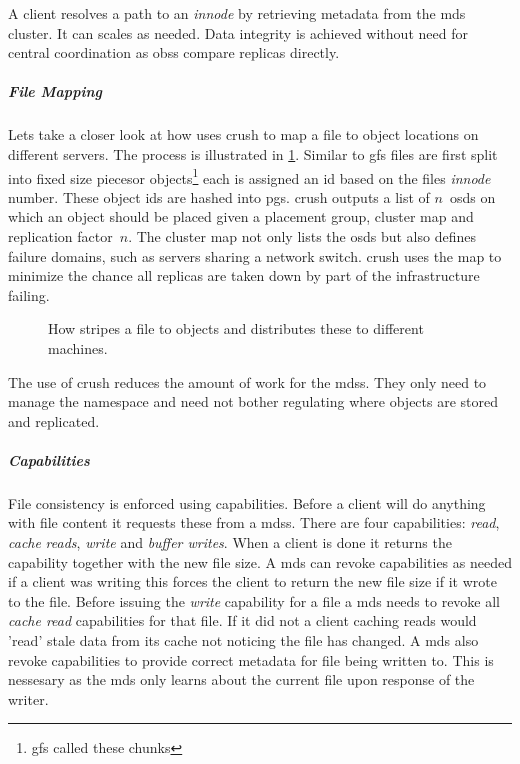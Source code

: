 A client resolves a path to an \textit{innode} by retrieving metadata from the \ac{mds} cluster. It can scales as needed. Data integrity is achieved without need for central coordination as \acp{obs} compare replicas directly. 

\subparagraph{File Mapping}
Lets take a closer look at how \ceph{} uses \ac{crush} to map a file to object locations on different servers. The process is illustrated in \cref{fig:ceph_crush}. Similar to \ac{gfs} files are first split into fixed size piecesor objects\footnote{\ac{gfs} called these chunks} each is assigned an id based on the files \textit{innode} number. These object ids are hashed into \acp{pg}. \ac{crush} outputs a list of $n$~\acp{osd} on which an object should be placed given a placement group, cluster map and replication factor~$n$. The cluster map not only lists the \acp{osd} but also defines failure domains, such as servers sharing a network switch. \ac{crush} uses the map to minimize the chance all replicas are taken down by part of the infrastructure failing.

\begin{figure}[htbp]
	\centering
	
	\caption{How \ceph{} stripes a file to objects and distributes these to different machines.}
	\label{fig:ceph_crush}
\end{figure}

The use of \ac{crush} reduces the amount of work for the \acp{mds}. They only need to manage the namespace and need not bother regulating where objects are stored and replicated.

\subparagraph{Capabilities}
File consistency is enforced using capabilities. Before a client will do anything with file content it requests these from a \acp{mds}. There are four capabilities: \textit{read}, \textit{cache} \textit{reads}, \textit{write} and \textit{buffer writes}. When a client is done it returns the capability together with the new file size. A \ac{mds} can revoke capabilities as needed if a client was writing this forces the client to return the new file size if it wrote to the file. Before issuing the \textit{write} capability for a file a \ac{mds} needs to revoke all \textit{cache read} capabilities for that file. If it did not a client caching reads would 'read' stale data from its cache not noticing the file has changed. A \ac{mds} also revoke capabilities to provide correct metadata for file being written to. This is nessesary as the \ac{mds} only learns about the current file upon response of the writer.

